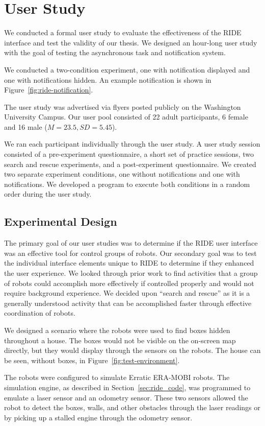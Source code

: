 \chapter{User Study}
We conducted a formal user study to evaluate the effectiveness of the RIDE interface and test the validity of our thesis. We designed an hour-long user study with the goal of testing the asynchronous task and notification system.

We conducted a two-condition experiment, one with notification displayed and one with notifications hidden. An example notification is shown in Figure~\ref{fig:ride-notification}. 

The user study was advertised via flyers posted publicly on the Washington University Campus. Our user pool consisted of 22 adult participants, 6 female and 16 male ($M=23.5, SD=5.45$).

We ran each participant individually through the user study. A user study session consisted of a pre-experiment questionnaire, a short set of practice sessions, two search and rescue experiments, and a post-experiment questionnaire. We created two separate experiment conditions, one without notifications and one with notifications. We developed a program to execute both conditions in a random order during the user study.

\section{Experimental Design}
The primary goal of our user studies was to determine if the RIDE user interface was an effective tool for control groups of robots. Our secondary goal was to test the individual interface elements unique to RIDE to determine if they enhanced the user experience. We looked through prior work to find activities that a group of robots could accomplish more effectively if controlled properly and would not require background experience. We decided upon ``search and rescue'' as it is a generally understood activity that can be accomplished faster through effective coordination of robots. 

We designed a scenario where the robots were used to find boxes hidden throughout a house. The boxes would not be visible on the on-screen map directly, but they would display through the sensors on the robots. The house can be seen, without boxes, in Figure~\ref{fig:test-environment}. 

The robots were configured to simulate Erratic ERA-MOBI robots. The simulation engine, as described in Section~\ref{sec:ride_code}, was programmed to emulate a laser sensor and an odometry sensor. These two sensors allowed the robot to detect the boxes, walls, and other obstacles through the laser readings or by picking up a stalled engine through the odometry sensor.

